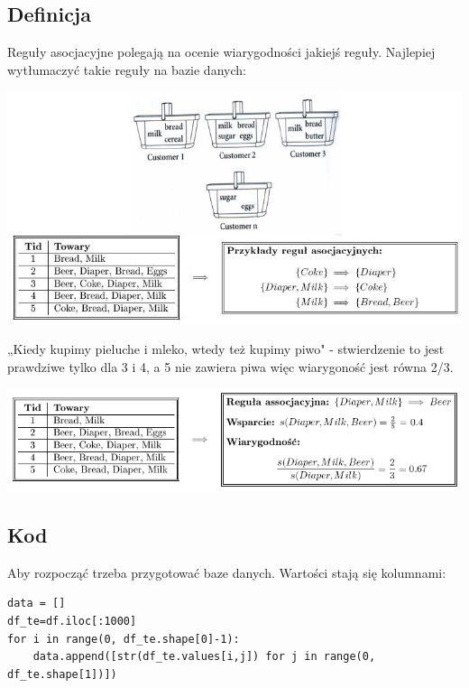 \documentclass{article}
\begin{document}
{\subsection{Definicja}
Reguły asocjacyjne polegają na ocenie wiarygodności jakiejś reguły. Najlepiej wytłumaczyć takie reguły na bazie danych:
\newline
    \begin{center}
    \includegraphics[width=1.0\textwidth]{regu.png}\newline
\end{center}
\newline
\large{„Kiedy kupimy pieluche i mleko, wtedy też kupimy piwo" - stwierdzenie to jest prawdziwe tylko dla 3 i 4, a 5 nie zawiera piwa więc wiarygoność jest równa 2/3.}
    \begin{center}
    \includegraphics[width=1.0\textwidth]{re2.png}\newline
\end{center}
\newpage
\subsection{Kod}
\newline\newline
\large{Aby rozpocząć trzeba przygotować baze danych. Wartości stają się kolumnami:}
\newline\newline
\begin{lstlisting}
data = []
df_te=df.iloc[:1000]
for i in range(0, df_te.shape[0]-1):
    data.append([str(df_te.values[i,j]) for j in range(0, df_te.shape[1])])


\end{lstlisting}}
\end{document}
